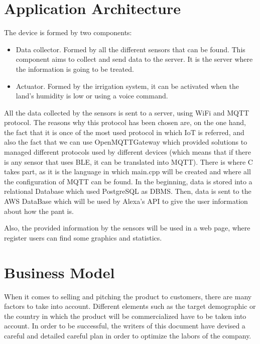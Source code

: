 \documentclass[english,runningheads,a4paper]{llncs}[2018/03/10]
\begin{document}

\section*{Application Architecture}

The device is formed by two components:
\begin{itemize}
\item Data collector. Formed by all the different sensors that can be found. This component aims to collect and send data to the server. It is the server where the information is going to be treated.
\item Actuator. Formed by the irrigation system, it can be activated when the land's humidity is low or using a voice command. 
\end{itemize}

All the data collected by the sensors is sent to a server, using WiFi and
MQTT protocol. The reasons why this protocol has been chosen are, on the 
one hand, the fact that it is once of the most used protocol in which IoT is referred,
and also the fact that we can use OpenMQTTGateway which provided 
solutions to managed different protocols used by different devices (which means that if there is any sensor that uses BLE, it can be translated into MQTT). 
There is where C takes part, as it is the language in which main.cpp will be created and where all the configuration of MQTT can be found. In the beginning,
data is stored into a relational Database which used PostgreSQL as DBMS. Then, data is sent to the AWS DataBase which will be used by Alexa's API to give
the user information about how the pant is.

Also, the provided information by the sensors will be used in a web page, where register users can find some graphics and statistics.


\section*{Business Model}

When it comes to selling and pitching the product to customers, there are many
factors to take into account. Different elements such as the target demographic
or the country in which the product will be commercialized have to be taken into
account. In order to be successful, the writers of this document have devised a
careful and detailed careful plan in order to optimize the labors of the
company.
\end{document}
